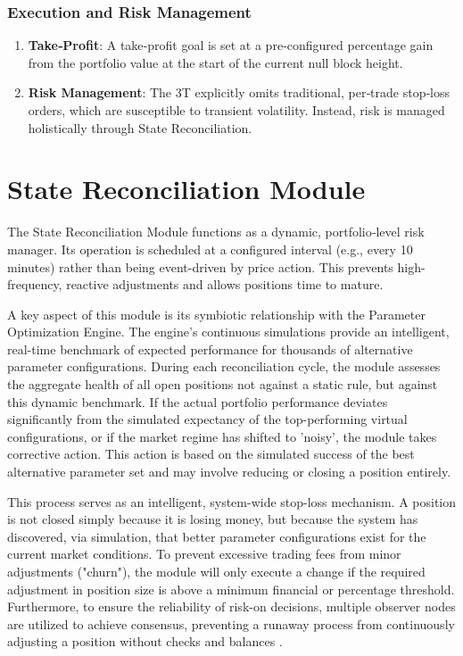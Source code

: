 \documentclass[10pt]{article}
\begin{document}
\subsubsection{Execution and Risk Management}
\begin{enumerate}
    \item \textbf{Take‑Profit}: A take‑profit goal is set at a pre‑configured percentage gain from the portfolio value at the start of the current null block height.
    \item \textbf{Risk Management}: The 3T explicitly omits traditional, per‑trade stop‑loss orders, which are susceptible to transient volatility. Instead, risk is managed holistically through State Reconciliation.
\end{enumerate}

\section{State Reconciliation Module}
The State Reconciliation Module functions as a dynamic, portfolio‑level risk manager. Its operation is scheduled at a configured interval (e.g., every 10 minutes) rather than being event-driven by price action. This prevents high-frequency, reactive adjustments and allows positions time to mature.

A key aspect of this module is its symbiotic relationship with the Parameter Optimization Engine. The engine's continuous simulations provide an intelligent, real-time benchmark of expected performance for thousands of alternative parameter configurations. During each reconciliation cycle, the module assesses the aggregate health of all open positions not against a static rule, but against this dynamic benchmark. If the actual portfolio performance deviates significantly from the simulated expectancy of the top-performing virtual configurations, or if the market regime has shifted to 'noisy', the module takes corrective action. This action is based on the simulated success of the best alternative parameter set and may involve reducing or closing a position entirely.

This process serves as an intelligent, system-wide stop-loss mechanism. A position is not closed simply because it is losing money, but because the system has discovered, via simulation, that better parameter configurations exist for the current market conditions. To prevent excessive trading fees from minor adjustments ("churn"), the module will only execute a change if the required adjustment in position size is above a minimum financial or percentage threshold. Furthermore, to ensure the reliability of risk-on decisions, multiple observer nodes are utilized to achieve consensus, preventing a runaway process from continuously adjusting a position without checks and balances \cite{lamport1982byzantine}.
\end{document}
